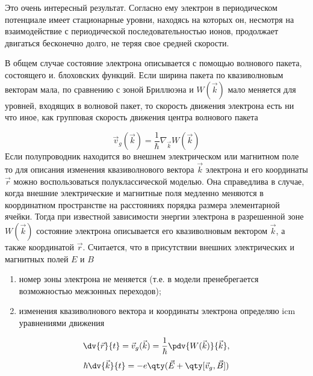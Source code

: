Это очень интересный результат. Согласно ему электрон в периодическом потенциале имеет стационарные уровни, находясь на которых он, несмотря на
взаимодействие с периодической последовательностью ионов, продолжает двигаться бесконечно долго, не теряя свое средней скорости.

В общем случае состояние электрона описывается с помощью волнового
пакета, состоящего и. блоховских функций. Если ширина пакета по квазиволновым векторам мала, по сравнению с зоной Бриллюэна и $W(\vec k)$ мало меняется для
уровней, входящих в волновой пакет, то скорость движения электрона есть ни
что иное, как групповая скорость движения центра волнового пакета

\begin{equation}
	\vec v_g(\vec k)=\frac{1}{\hbar} \nabla_{\vec k} W(\vec k)
\end{equation}
	Если полупроводник находится во внешнем электрическом или магнитном поле
то для описания изменения квазиволнового вектора $\vec{k}$ электрона и его координаты $\vec r$ можно воспользоваться полуклассической моделью. Она справедлива в
случае, когда внешние электрические и магнитные поля медленно меняются в
координатном пространстве на расстояниях порядка размера элементарной
ячейки. Тогда при известной зависимости энергии электрона в разрешенной зоне
$W(\vec k)$ состояние электрона описывается его квазиволновым вектором $\vec k$, а также
координатой $\vec r$. Считается, что в присутствии внешних электрических и магнитных полей $E$ и $B$

\begin{enumerate}
	\item номер зоны электрона не меняется (т.е. в модели пренебрегается 
	возможностью межзонных переходов);
	\item изменения квазиволнового вектора и координаты электрона определяю icm
уравнениями движения
\end{enumerate}

\begin{equation}
	\label{eq:1.4a}
	\dv{\vec r}{t}=\vec v_g (\vec k)=\frac{1}{\hbar} \pdv{W(\vec{k})}{\vec{k}},
\end{equation}
\begin{equation}
	\label{eq:1.4b}
	\hbar \dv{\vec{k}}{t}= -e \qty(\vec{E}+ \qty[\vec v_g, \vec B] )
\end{equation}

